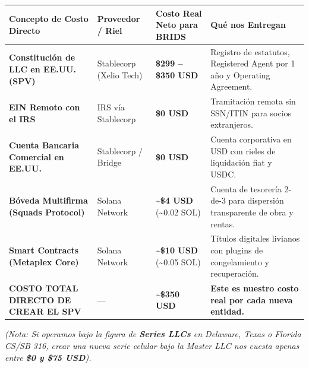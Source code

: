 \documentclass[
]{article}
\newcounter{none} %
\begin{document}
{\def\LTcaptype{none} %
\begin{longtable}[]{@{}
  >{\raggedright\arraybackslash}p{}
  >{\raggedright\arraybackslash}p{}
  >{\centering\arraybackslash}p{}
  >{\raggedright\arraybackslash}p{}@{}}
\toprule\noalign{}
\begin{minipage}[b]{\linewidth}\raggedright
Concepto de Costo Directo
\end{minipage} & \begin{minipage}[b]{\linewidth}\raggedright
Proveedor / Riel
\end{minipage} & \begin{minipage}[b]{\linewidth}\centering
Costo Real Neto para BRIDS
\end{minipage} & \begin{minipage}[b]{\linewidth}\raggedright
Qué nos Entregan
\end{minipage} \\
\midrule\noalign{}
\endhead
\bottomrule\noalign{}
\endlastfoot
\textbf{Constitución de LLC en EE.UU. (SPV)} & Stablecorp (Xelio Tech) &
\textbf{\$299 -- \$350 USD} & Registro de estatutos, Registered Agent
por 1 año y Operating Agreement. \\
\textbf{EIN Remoto con el IRS} & IRS vía Stablecorp & \textbf{\$0 USD} &
Tramitación remota sin SSN/ITIN para socios extranjeros. \\
\textbf{Cuenta Bancaria Comercial en EE.UU.} & Stablecorp / Bridge &
\textbf{\$0 USD} & Cuenta corporativa en USD con rieles de liquidación
fiat y USDC. \\
\textbf{Bóveda Multifirma (Squads Protocol)} & Solana Network &
\textbf{\textasciitilde\$4 USD} (\textasciitilde0.02 SOL) & Cuenta de
tesorería 2-de-3 para dispersión transparente de obra y rentas. \\
\textbf{Smart Contracts (Metaplex Core)} & Solana Network &
\textbf{\textasciitilde\$10 USD} (\textasciitilde0.05 SOL) & Títulos
digitales livianos con plugins de congelamiento y recuperación. \\
\textbf{COSTO TOTAL DIRECTO DE CREAR EL SPV} & --- &
\textbf{\textasciitilde\$350 USD} & \textbf{Este es nuestro costo real
por cada nueva entidad.} \\
\end{longtable}
}

\emph{(Nota: Si operamos bajo la figura de \textbf{Series LLCs} en
Delaware, Texas o Florida CS/SB 316, crear una nueva serie celular bajo
la Master LLC nos cuesta apenas entre \textbf{\$0 y \$75 USD}).}
\end{document}
